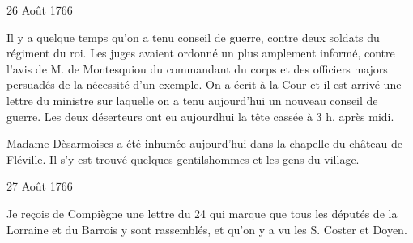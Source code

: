                      \begin{diary}{26 Août 1766}{}

                         Il y a quelque temps qu'on a tenu conseil
                           de guerre, contre deux soldats du régiment du roi.
                           Les juges avaient ordonné un plus amplement
                           informé, contre l'avis de M. de
                              Montesquiou
                           du commandant du corps et des officiers
                           majors persuadés de la nécessité d'un exemple.
                           On a écrit à la Cour et il est arrivé une
                           lettre du ministre sur
                           laquelle on a tenu
                           aujourd'hui un nouveau conseil de guerre.
                           Les deux déserteurs ont eu aujourdhui
                           la tête cassée à 3 h. après midi. \bigskip



                           Madame Dèsarmoises a été inhumée
                           aujourd'hui dans la chapelle du
                              château
                              de Fléville. Il s'y est trouvé quelques
                           gentilshommes et les gens du village. \bigskip


                     \end{diary}

                     \begin{diary}{27 Août 1766}{}

                         Je reçois de Compiègne une lettre du 24
                           qui marque que tous les députés de la Lorraine
                           et du Barrois y sont
                           rassemblés, et qu'on y
                           a vu les S.
                           Coster et Doyen. \bigskip


                     \end{diary}

